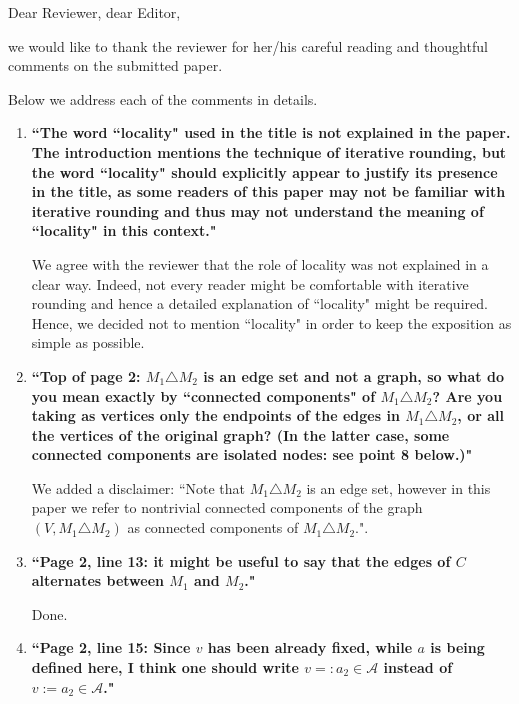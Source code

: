 \documentclass[11pt]{article}
\begin{document}
Dear Reviewer, dear Editor,

\bigskip

we would like to thank the reviewer for her/his careful reading and thoughtful comments on the submitted paper. 

Below we address each of the comments in details.

\begin{enumerate}
	\item \textbf{``The word ``locality" used in the title is not explained in the paper. The introduction mentions the technique of iterative rounding, but the word ``locality" should explicitly appear to justify its presence in the title, as some readers of this paper may not be familiar with iterative rounding and thus may not understand the meaning of ``locality" in this context."}
	
	\smallskip
	
	We agree with the reviewer that the role of locality was not explained in a clear way. Indeed, not every reader might be comfortable with iterative rounding and hence a detailed explanation of ``locality" might be required. Hence, we decided not to mention ``locality" in order to keep the exposition as simple as possible.
	
	\bigskip
	
	\item  \textbf{``Top of page 2: $M_1\triangle M_2$ is an edge set and not a graph, so what do you mean exactly by ``connected components" of $M_1\triangle M_2$? Are you taking as vertices only the endpoints
of the edges in $M_1\triangle M_2$, or all the vertices of the original graph? (In the latter case,
some connected components are isolated nodes: see point 8 below.)"}
	
	\smallskip
	
	We added a disclaimer: ``Note that $M_1\triangle M_2$ is an edge set, however in this paper we refer to nontrivial connected components of the graph $(V, M_1\triangle M_2)$ as connected components of $M_1\triangle M_2$.".
	
	\bigskip

	\item  \textbf{``Page 2, line 13: it might be useful to say that the edges of $C$ alternates between $M_1$
and $M_2$."}
	
	\smallskip
	
	Done.
	
	\bigskip
	
	\item \textbf{``Page 2, line 15: Since $v$ has been already fixed, while $a$ is being defined here, I think
one should write $v =: a_2 \in \mathcal{A}$ instead of $v := a_2\in \mathcal{A}$."}
	

\end{enumerate}
\end{document}
